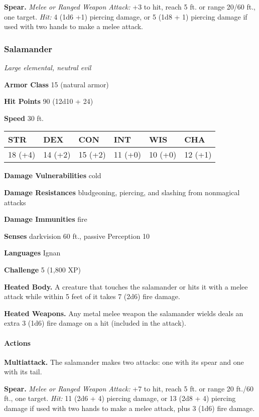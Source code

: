 \documentclass[
]{article}
\begin{document}
\textbf{Spear.} \emph{Melee or Ranged Weapon Attack:} +3 to hit, reach 5
ft. or range 20/60 ft., one target. \emph{Hit:} 4 (1d6 +1) piercing
damage, or 5 (1d8 + 1) piercing damage if used with two hands to make a
melee attack.

\hypertarget{salamander}{%
\subsubsection{Salamander}\label{salamander}}

\emph{Large elemental, neutral evil}

\textbf{Armor Class} 15 (natural armor)

\textbf{Hit Points} 90 (12d10 + 24)

\textbf{Speed} 30 ft.

\begin{longtable}[]{@{}llllll@{}}
\toprule
STR & DEX & CON & INT & WIS & CHA\tabularnewline
\midrule
\endhead
18 (+4) & 14 (+2) & 15 (+2) & 11 (+0) & 10 (+0) & 12 (+1)\tabularnewline
\bottomrule
\end{longtable}

\textbf{Damage Vulnerabilities} cold

\textbf{Damage Resistances} bludgeoning, piercing, and slashing from
nonmagical attacks

\textbf{Damage Immunities} fire

\textbf{Senses} darkvision 60 ft., passive Perception 10

\textbf{Languages} Ignan

\textbf{Challenge} 5 (1,800 XP)

\textbf{Heated Body.} A creature that touches the salamander or hits it
with a melee attack while within 5 feet of it takes 7 (2d6) fire damage.

\textbf{Heated Weapons.} Any metal melee weapon the salamander wields
deals an extra 3 (1d6) fire damage on a hit (included in the attack).

\hypertarget{actions-1}{%
\paragraph{Actions}\label{actions-1}}

\textbf{Multiattack.} The salamander makes two attacks: one with its
spear and one with its tail.

\textbf{Spear.} \emph{Melee or Ranged Weapon Attack:} +7 to hit, reach 5
ft. or range 20 ft./60 ft., one target. \emph{Hit:} 11 (2d6 + 4)
piercing damage, or 13 (2d8 + 4) piercing damage if used with two hands
to make a melee attack, plus 3 (1d6) fire damage.
\end{document}
